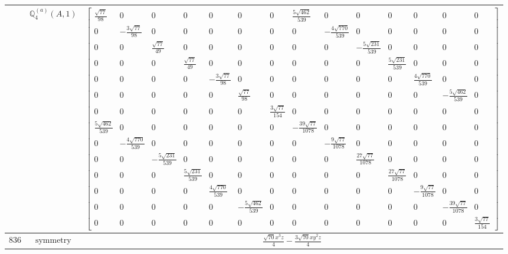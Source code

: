 \documentclass[fleqn,8pt,landscape]{jsarticle}
\begin{document}
\begin{longtable}{ccc}
$  $ & $ \mathbb{Q}_{4}^{(a)}(A,1) $ & $ \begin{bmatrix} \frac{\sqrt{77}}{98} & 0 & 0 & 0 & 0 & 0 & 0 & \frac{5 \sqrt{462}}{539} & 0 & 0 & 0 & 0 & 0 & 0 \\ 0 & - \frac{3 \sqrt{77}}{98} & 0 & 0 & 0 & 0 & 0 & 0 & - \frac{4 \sqrt{770}}{539} & 0 & 0 & 0 & 0 & 0 \\ 0 & 0 & \frac{\sqrt{77}}{49} & 0 & 0 & 0 & 0 & 0 & 0 & - \frac{5 \sqrt{231}}{539} & 0 & 0 & 0 & 0 \\ 0 & 0 & 0 & \frac{\sqrt{77}}{49} & 0 & 0 & 0 & 0 & 0 & 0 & \frac{5 \sqrt{231}}{539} & 0 & 0 & 0 \\ 0 & 0 & 0 & 0 & - \frac{3 \sqrt{77}}{98} & 0 & 0 & 0 & 0 & 0 & 0 & \frac{4 \sqrt{770}}{539} & 0 & 0 \\ 0 & 0 & 0 & 0 & 0 & \frac{\sqrt{77}}{98} & 0 & 0 & 0 & 0 & 0 & 0 & - \frac{5 \sqrt{462}}{539} & 0 \\ 0 & 0 & 0 & 0 & 0 & 0 & \frac{3 \sqrt{77}}{154} & 0 & 0 & 0 & 0 & 0 & 0 & 0 \\ \frac{5 \sqrt{462}}{539} & 0 & 0 & 0 & 0 & 0 & 0 & - \frac{39 \sqrt{77}}{1078} & 0 & 0 & 0 & 0 & 0 & 0 \\ 0 & - \frac{4 \sqrt{770}}{539} & 0 & 0 & 0 & 0 & 0 & 0 & - \frac{9 \sqrt{77}}{1078} & 0 & 0 & 0 & 0 & 0 \\ 0 & 0 & - \frac{5 \sqrt{231}}{539} & 0 & 0 & 0 & 0 & 0 & 0 & \frac{27 \sqrt{77}}{1078} & 0 & 0 & 0 & 0 \\ 0 & 0 & 0 & \frac{5 \sqrt{231}}{539} & 0 & 0 & 0 & 0 & 0 & 0 & \frac{27 \sqrt{77}}{1078} & 0 & 0 & 0 \\ 0 & 0 & 0 & 0 & \frac{4 \sqrt{770}}{539} & 0 & 0 & 0 & 0 & 0 & 0 & - \frac{9 \sqrt{77}}{1078} & 0 & 0 \\ 0 & 0 & 0 & 0 & 0 & - \frac{5 \sqrt{462}}{539} & 0 & 0 & 0 & 0 & 0 & 0 & - \frac{39 \sqrt{77}}{1078} & 0 \\ 0 & 0 & 0 & 0 & 0 & 0 & 0 & 0 & 0 & 0 & 0 & 0 & 0 & \frac{3 \sqrt{77}}{154} \end{bmatrix} $ \\ \hline
$ 836 $ & $ \text{symmetry} $ & $ \frac{\sqrt{70} x^{3} z}{4} - \frac{3 \sqrt{70} x y^{2} z}{4} $ \\

\end{longtable}
\end{document}
